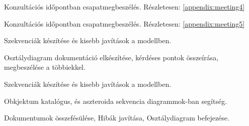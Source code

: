 \documentclass[../../projlab]{subfiles}
\begin{document}
\begin{naplo}
	{ 
		Konzultációs időpontban csapatmegbeszélés.
        Részletesen: \ref{appendix:meeting4}
	}

	{ 
		Konzultációs időpontban csapatmegbeszélés.
        Részletesen: \ref{appendix:meeting5}
	}
	{ 
		Szekvenciák készítése és kisebb javítások a modellben.
        
	}
	{ 
		Osztálydiagram dokumentáció elkészítése, kérdéses pontok összeírása, megbeszélése a többiekkel.
        
	}
	{ 
		Szekvenciák készítése és kisebb javítások a modellben.
        
	}
	{ 
		Obkjektum katalógus, és aszteroida sekvencia diagrammok-ban segítség.   
	}

	{ 
		Dokumentumok összefésülése, Hibák javítása, Osztálydiagram befejezése.   
	}

\end{naplo}

\begin{toappendix}


	
\end{toappendix}
\end{document}
